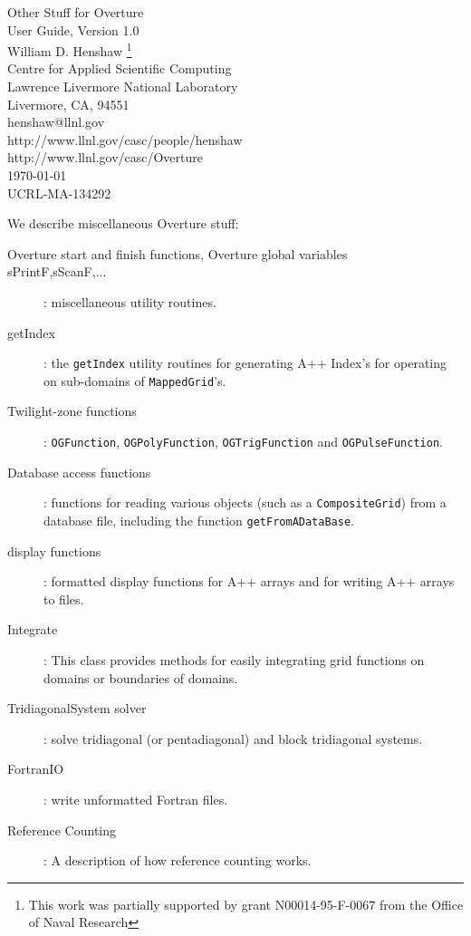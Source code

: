 \documentclass{article}
\begin{document}


\vspace{5\baselineskip}
\begin{flushleft}
{\Large
Other Stuff for Overture\\
User Guide, Version 1.0\\
}
\vspace{2\baselineskip}
William D. Henshaw
\footnote{
        This work was partially
        supported by grant N00014-95-F-0067 from the Office of Naval
        Research
        } \\
\vspace{\baselineskip}
Centre for Applied Scientific Computing \\
Lawrence Livermore National Laboratory    \\
Livermore, CA, 94551   \\
henshaw@llnl.gov \\
http://www.llnl.gov/casc/people/henshaw \\
http://www.llnl.gov/casc/Overture\\
\vspace{\baselineskip}
\today\\
\vspace{\baselineskip}
UCRL-MA-134292

\vspace{4\baselineskip}

We describe miscellaneous Overture stuff:
\begin{description}
 \item[Overture start and finish functions, Overture global variables]
 \item[sPrintF,sScanF,...] : miscellaneous utility routines.
 \item[getIndex] : the {\tt getIndex} utility routines for generating A++ Index's for operating
     on sub-domains of {\tt MappedGrid}'s.
  \item[Twilight-zone functions]: {\tt OGFunction}, {\tt OGPolyFunction}, {\tt OGTrigFunction} and
      {\tt OGPulseFunction}.
  \item[Database access functions]: functions for reading various objects (such as a {\tt CompositeGrid})
     from a database file, including the function {\tt getFromADataBase}.
  \item[display functions] : formatted display functions for A++ arrays and for writing A++ arrays to files.
  \item[Integrate] : This class provides methods for easily integrating grid functions on domains
      or boundaries of domains.
  \item[TridiagonalSystem solver] : solve tridiagonal (or pentadiagonal) and block tridiagonal systems.
  \item[FortranIO] : write unformatted Fortran files.
  \item[Reference Counting]: A description of how reference counting works.
\end{description}
\end{flushleft}
\end{document}
